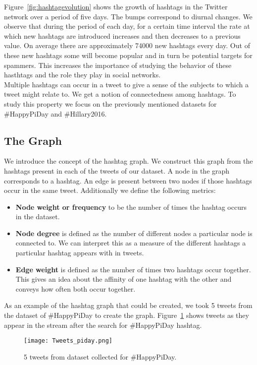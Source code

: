 \documentclass[journal, a4paper, 12pt]{article}
\begin{document}
Figure~\ref{fig:hashtagevolution} shows the growth of hashtags in the Twitter network over a period of five days. The bumps correspond to diurnal changes. We observe that during the period of each day, for a certain time interval the rate at which new hashtags are introduced increases and then decreases to a previous value. On average there are approximately 74000 new hashtags every day. Out of these new hashtags some will become popular and in turn be potential targets for spammers. This increases the importance of studying the behavior of these hasthtags and the role they play in social networks. \\

Multiple hashtags can occur in a tweet to give a sense of the subjects to which a tweet might relate to. We get a notion of connectedness among hashtags. To study this property we focus on the previously mentioned datasets for \#HappyPiDay and \#Hillary2016.


\subsection{The Graph}
We introduce the concept of the hashtag graph. We construct this graph from the hashtags present in each of the tweets of our dataset. A node in the graph corresponds to a hashtag. An edge is present between two nodes if those hashtags occur in the same tweet. Additionally we define the following metrics:
\begin{itemize}
\item
\textbf{Node weight or frequency} to be the number of times the hashtag occurs in the dataset.
\item
\textbf{Node degree} is defined as the number of different nodes a particular node is connected to. We can interpret this as a measure of the different hashtags a particular hashtag appears with in tweets.
\item
\textbf{Edge weight} is defined as the number of times two hashtags occur together. This gives an idea about the affinity of one hashtag with the other and conveys how often both occur together.
\end{itemize}

As an example of the hashtag graph that could be created, we took 5 tweets from the dataset of \#HappyPiDay to create the graph. Figure~\ref{fig:tweets_piday} shows tweets as they appear in the stream after the search for \#HappyPiDay hashtag.
\\

  \begin{figure}[!hbt]
            \begin{center}
            \texttt{[image: Tweets\_piday.png]}
            \caption{5 tweets from dataset collected for \#HappyPiDay.}
            \label{fig:tweets_piday}
            \end{center}
      \end{figure}
    
\end{document}
